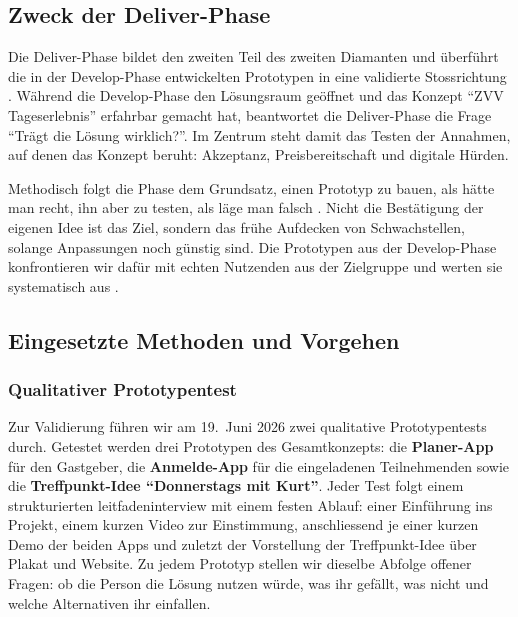 \subsection{Zweck der Deliver-Phase}

Die Deliver-Phase bildet den zweiten Teil des zweiten Diamanten und überführt die in der Develop-Phase entwickelten Prototypen in eine validierte Stossrichtung \parencite{designcouncil2005}. Während die Develop-Phase den Lösungsraum geöffnet und das Konzept \enquote{ZVV Tageserlebnis} erfahrbar gemacht hat, beantwortet die Deliver-Phase die Frage \enquote{Trägt die Lösung wirklich?}. Im Zentrum steht damit das Testen der Annahmen, auf denen das Konzept beruht: Akzeptanz, Preisbereitschaft und digitale Hürden.

Methodisch folgt die Phase dem Grundsatz, einen Prototyp zu bauen, als hätte man recht, ihn aber zu testen, als läge man falsch \parencite{leifer2015}. Nicht die Bestätigung der eigenen Idee ist das Ziel, sondern das frühe Aufdecken von Schwachstellen, solange Anpassungen noch günstig sind. Die Prototypen aus der Develop-Phase konfrontieren wir dafür mit echten Nutzenden aus der Zielgruppe und werten sie systematisch aus \parencite{zhaw2026testing}.

\subsection{Eingesetzte Methoden und Vorgehen}

\subsubsection{Qualitativer Prototypentest}
Zur Validierung führen wir am 19.~Juni 2026 zwei qualitative Prototypentests durch. Getestet werden drei Prototypen des Gesamtkonzepts: die \textbf{Planer-App} für den Gastgeber, die \textbf{Anmelde-App} für die eingeladenen Teilnehmenden sowie die \textbf{Treffpunkt-Idee \enquote{Donnerstags mit Kurt}}. Jeder Test folgt einem strukturierten \gls{leitfadeninterview} mit einem festen Ablauf: einer Einführung ins Projekt, einem kurzen Video zur Einstimmung, anschliessend je einer kurzen Demo der beiden Apps und zuletzt der Vorstellung der Treffpunkt-Idee über Plakat und Website. Zu jedem Prototyp stellen wir dieselbe Abfolge offener Fragen: ob die Person die Lösung nutzen würde, was ihr gefällt, was nicht und welche Alternativen ihr einfallen.

